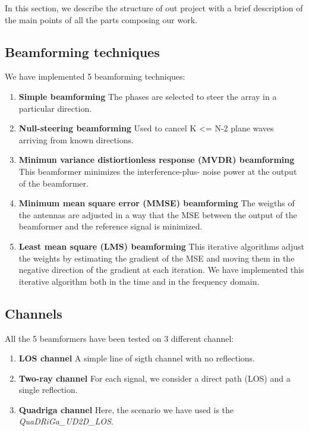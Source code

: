 In this section, we describe the structure of out project with a brief description of 
the main points of all the parts composing our work.

\subsection{Beamforming techniques}

We have implemented 5 beamforming techniques:

\begin{enumerate}
    \item \textbf{Simple beamforming} The phases are selected to steer the array in a particular direction.
    \item \textbf{Null-steering beamforming} Used to cancel K <= N-2 plane waves arriving from known directions.
    \item \textbf{Minimun variance distiortionless response (MVDR) beamforming} This beamformer minimizes the interference-plus-
            noise power at the output of the beamformer. 
    \item \textbf{Minimum mean square error (MMSE) beamforming} The weigths of the antennas are adjusted in a way that the
            MSE between the output of the beamformer and the reference signal is minimized.
    \item \textbf{Least mean square (LMS) beamforming} This iterative algorithms adjust the weights by estimating the
            gradient of the MSE and moving them in the negative direction of the gradient at each iteration. We have 
            implemented this iterative algorithm both in the time and in the frequency domain.
\end{enumerate}

\subsection{Channels}

All the 5 beamformers have been tested on 3 different channel:

\begin{enumerate}
    \item \textbf{LOS channel} A simple line of sigth channel with no reflections.
    \item \textbf{Two-ray channel} For each signal, we consider a direct path (LOS) and a single reflection.
    \item \textbf{Quadriga channel} Here, the scenario we have used is the \textit{QuaDRiGa\_UD2D\_LOS}.
\end{enumerate}


